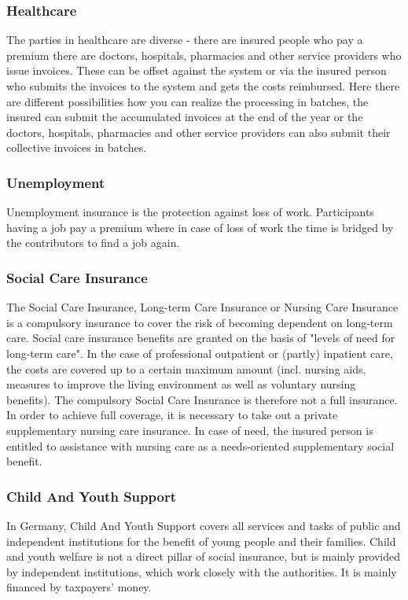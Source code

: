 \subsubsection*{Healthcare}
The parties in healthcare are diverse - there are insured people who pay a premium there are doctors, hospitals, pharmacies and other service providers who issue invoices. These can be offset against the system or via the insured person who submits the invoices to the system and gets the costs reimbursed. Here there are different possibilities how you can realize the processing in batches, the insured can submit the accumulated invoices at the end of the year or the doctors, hospitals, pharmacies and other service providers can also submit their collective invoices in batches.

\subsubsection*{Unemployment}
Unemployment insurance is the protection against loss of work. Participants having a job pay a premium where in case of loss of work the time is bridged by the contributors to find a job again.

\subsubsection*{Social Care Insurance}

The Social Care Insurance, Long-term Care Insurance or Nursing Care Insurance  is a compulsory insurance to cover the risk of becoming dependent on long-term care. Social care insurance benefits are granted on the basis of "levels of need for long-term care". In the case of professional outpatient or (partly) inpatient care, the costs are covered up to a certain maximum amount (incl. nursing aids, measures to improve the living environment as well as voluntary nursing benefits). The compulsory Social Care Insurance is therefore not a full insurance. In order to achieve full coverage, it is necessary to take out a private supplementary nursing care insurance. In case of need, the insured person is entitled to assistance with nursing care as a needs-oriented supplementary social benefit.

\subsubsection*{Child And Youth Support}
In Germany, Child And Youth Support covers all services and tasks of public and independent institutions for the benefit of young people and their families. Child and youth welfare is not a direct pillar of social insurance, but is mainly provided by independent institutions, which work closely with the authorities. It is mainly financed by taxpayers' money. 

